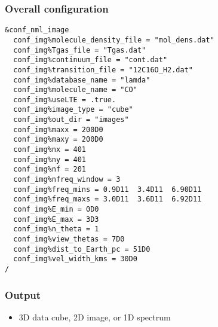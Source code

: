 \documentclass{article}
\begin{document}
\subsubsection{Overall configuration}

\begin{lstlisting}
&conf_nml_image
  conf_img%molecule_density_file = "mol_dens.dat"
  conf_img%Tgas_file = "Tgas.dat"
  conf_img%continuum_file = "cont.dat"
  conf_img%transition_file = "12C16O_H2.dat"
  conf_img%database_name = "lamda"
  conf_img%molecule_name = "CO"
  conf_img%useLTE = .true.
  conf_img%image_type = "cube"
  conf_img%out_dir = "images"
  conf_img%maxx = 200D0
  conf_img%maxy = 200D0
  conf_img%nx = 401
  conf_img%ny = 401
  conf_img%nf = 201
  conf_img%nfreq_window = 3
  conf_img%freq_mins = 0.9D11  3.4D11  6.90D11
  conf_img%freq_maxs = 3.0D11  3.6D11  6.92D11
  conf_img%E_min = 0D0
  conf_img%E_max = 3D3
  conf_img%n_theta = 1
  conf_img%view_thetas = 7D0
  conf_img%dist_to_Earth_pc = 51D0
  conf_img%vel_width_kms = 30D0
/
\end{lstlisting}

\subsubsection{Output}

\begin{itemize}
  \item 3D data cube, 2D image, or 1D spectrum
\end{itemize}  

\end{document}
